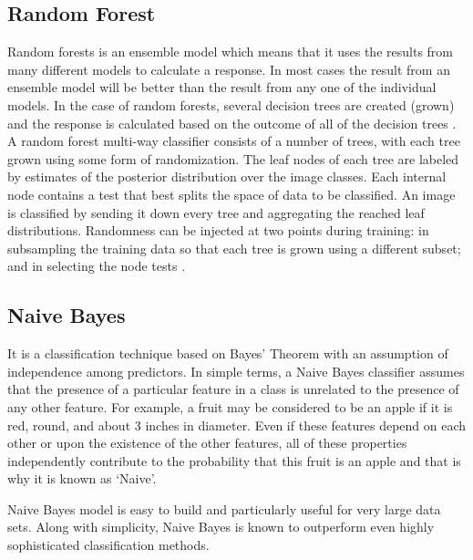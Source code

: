 \documentclass[12pt]{article}
\numberwithin{equation}{section}
\numberwithin{table}{section}
\numberwithin{figure}{section}
\begin{document}
\subsection{Random Forest} \label{randomf}

Random forests is an ensemble model which means that it uses the results from many different models to calculate a response. In most cases the result from an ensemble model will be better than the result from any one of the individual models. In the case of random forests, several decision trees are created (grown) and the response is calculated based on the outcome of all of the decision trees \cite{Horning2010}.   A random forest multi-way classifier consists of a number of trees, with each tree grown using some form of randomization. The leaf nodes of each tree are labeled by estimates of the posterior distribution over the image classes. Each internal node contains a test that best splits the space of data to be classified. An image is classified by sending it down every tree and aggregating the reached leaf distributions. Randomness can be injected at two points during training: in subsampling the training data so that each tree is grown using a different subset; and in selecting the node tests \cite{Bosch2007}.



\subsection{Naive Bayes} \label{naive}

It is a classification technique based on Bayes’ Theorem with an assumption of independence among predictors. In simple terms, a Naive Bayes classifier assumes that the presence of a particular feature in a class is unrelated to the presence of any other feature. For example, a fruit may be considered to be an apple if it is red, round, and about 3 inches in diameter. Even if these features depend on each other or upon the existence of the other features, all of these properties independently contribute to the probability that this fruit is an apple and that is why it is known as ‘Naive’.

Naive Bayes model is easy to build and particularly useful for very large data sets. Along with simplicity, Naive Bayes is known to outperform even highly sophisticated classification methods.
\end{document}
